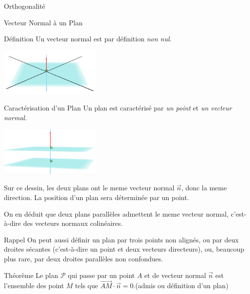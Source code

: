 \documentclass{coursbook}
\begin{document}
\begin{Gpartie}{Orthogonalité}
\begin{Spartie}{Vecteur Normal à un Plan}
\begin{SSpartie}{Définition}
                Un vecteur normal est par définition \emph{non nul}.
    
                \begin{center}
                        \includegraphics[width=5cm]{rsc/12fig3.png}
                    \parbox{\linewidth}{}
                \end{center}
            \end{SSpartie}
            \begin{SSpartie}{Caractérisation d'un Plan}
                Un plan est caractérisé par \emph{un point} et \emph{un vecteur normal}.

                \begin{center}
                    \includegraphics[width=5cm]{rsc/12fig4.png}
                    \parbox{\linewidth}{}
                \end{center}
                
                                    Sur ce dessin, les deux plans ont le meme vecteur normal $\vec{n}$, donc la meme direction. La position d'un plan sera déterminée par un point.
                
                                    On en déduit que deux plans parallèles admettent le meme vecteur normal, c'est-à-dire des vecteurs normaux colinéaires.
                \begin{SSSpartie}{Rappel} 
                    On peut aussi définir un plan par trois points non alignés, ou par deux droites sécantes (c'est-à-dire un point et deux vecteurs directeurs), ou, beaucoup plus rare, par deux droites parallèles non confondues.
                \end{SSSpartie}
            \end{SSpartie}
            \begin{SSpartie}{Théorème} 
                Le plan $\mathcal{P}$ qui passe par un point $A$ et de vecteur normal $\vec{n}$ est l'ensemble des point $M$ tels que $\overrightarrow{AM}\cdot\vec{n}=0$.\quad (admis ou définition d'un plan)


\end{SSpartie}
\end{Spartie}
\end{Gpartie}
\end{document}
